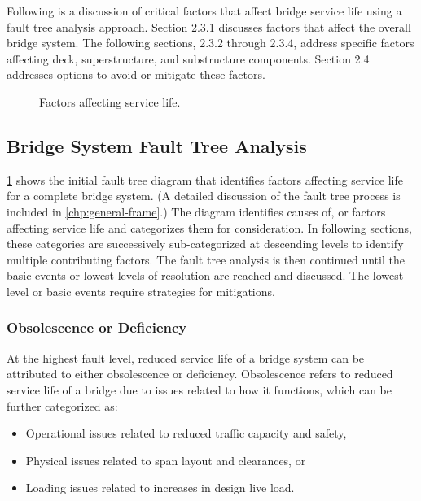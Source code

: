 Following is a discussion of critical factors that affect bridge service life using a fault tree analysis approach. Section 2.3.1 discusses factors that affect the overall bridge system. The following sections, 2.3.2 through 2.3.4, address specific factors affecting deck, superstructure, and substructure components. Section 2.4 addresses options to avoid or mitigate these factors.

\begin{figure}
  \caption{Factors affecting service life.}
  \label{fig:factor-service-life}
\end{figure}

\subsection{Bridge System Fault Tree Analysis}

\cref{fig:factor-service-life} shows the initial fault tree diagram that identifies factors affecting service life for a complete bridge system. (A detailed discussion of the fault tree process is included in \cref{chp:general-frame}.) The diagram identifies causes of, or factors affecting service life and categorizes them for consideration. In following sections, these categories are successively sub-categorized at descending levels to identify multiple contributing factors. The fault tree analysis is then continued until the basic events or lowest levels of resolution are reached and discussed. The lowest level or basic events require strategies for mitigations.

\subsubsection{Obsolescence or Deficiency}

At the highest fault level, reduced service life of a bridge system can be attributed to either obsolescence or deficiency. Obsolescence refers to reduced service life of a bridge due to issues related to how it functions, which can be further categorized as:
\begin{itemize}
  \item Operational issues related to reduced traffic capacity and safety,
  \item Physical issues related to span layout and clearances, or
  \item Loading issues related to increases in design live load.
\end{itemize}

